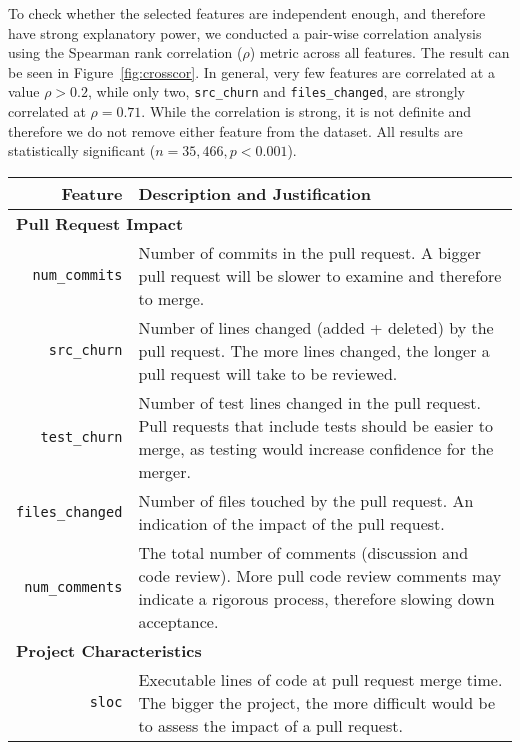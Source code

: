 \documentclass{sig-alternate}
\begin{document}
To check whether the selected features are independent enough, and therefore
have strong explanatory power, we conducted a pair-wise correlation analysis
using the Spearman rank correlation ($\rho$) metric across all features.  The
result can be seen in Figure~\ref{fig:crosscor}. In general, very few features
are correlated at a value $\rho > 0.2$, while only two, \texttt{src\_churn} and
\texttt{files\_changed}, are strongly correlated at $\rho = 0.71$. While the
correlation is strong, it is not definite and therefore we do not remove either
feature from the dataset. All results are statistically significant ($n =
35,466, p < 0.001$).

\begin{table*}
  \begin{small}
  \centering
  \begin{tabular}{rp{40em}}
    \hline
    \bf{Feature} & \bf{Description and Justification}\\
    \hline
    \multicolumn{2}{l}{\bf{Pull Request Impact}}\\
    
    \texttt{num\_commits} & Number of commits in the pull request. A bigger
    pull request will be slower to examine and therefore to merge.\\
    
    \texttt{src\_churn} & Number of lines changed (added + deleted) by the pull
    request. The more lines changed, the longer a pull request will take to be
    reviewed.\\

    \texttt{test\_churn} & Number of test lines changed in the pull request. Pull requests
    that include tests should be easier to merge, as testing would increase
    confidence for the merger.\\
    
    \texttt{files\_changed} & Number of files touched by the pull request. An
    indication of the impact of the pull request.\\
    
    \texttt{num\_comments} & The total number of comments (discussion and code
    review). More pull code review comments may indicate a rigorous process,
    therefore slowing down acceptance.\\

    \multicolumn{2}{l}{\bf{Project Characteristics}}\\
    
    \texttt{sloc} & Executable lines of code at pull request merge time. The
    bigger the project, the more difficult would be to assess the impact of
    a pull request. \\


\end{tabular}
\end{small}
\end{table*}
\end{document}
